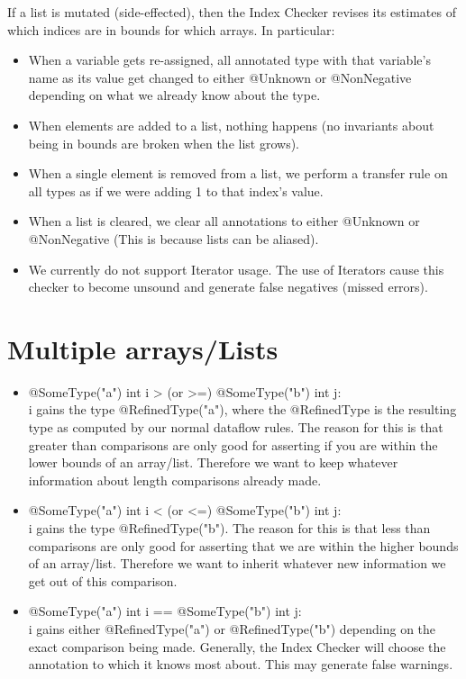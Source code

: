 If a list is mutated (side-effected), then the Index Checker revises its
estimates of which indices are in bounds for which arrays. In particular:
\begin{itemize}
\item When a variable gets re-assigned, all annotated type with that variable's name as its value
get changed to either @Unknown or @NonNegative depending on what we already know about the type.
\item When elements are added to a list, nothing happens (no invariants about being in bounds are
broken when the list grows).
\item When a single element is removed from a list, we perform a transfer rule on all types as if
we were adding 1 to that index's value.
\item When a list is cleared, we clear all annotations to either @Unknown or @NonNegative (This is
because lists can be aliased).
\item We currently do not support Iterator usage. The use of Iterators cause this checker to become
unsound and generate false negatives (missed errors).
\end{itemize}

\section{Multiple arrays/Lists\label{index-multiples}}
\begin{itemize}
\item @SomeType("a") int i > (or >=) @SomeType("b") int j:\\
i gains the type @RefinedType("a"), where the @RefinedType is the resulting type as computed by our
normal dataflow rules. The reason for this is that greater than comparisons are only good for
asserting if you are within the lower bounds of an array/list. Therefore we want to keep whatever
information about length comparisons already made.
\item @SomeType("a") int i < (or <=) @SomeType("b") int j:\\
i gains the type @RefinedType("b"). The
reason for this is that less than comparisons are only good for asserting that we are within the
higher bounds of an array/list. Therefore we want to inherit whatever new information we get out of
this comparison.
\item @SomeType("a") int i == @SomeType("b") int j:\\
i gains either @RefinedType("a") or @RefinedType("b") depending on the exact comparison being made.
Generally, the Index Checker will choose the annotation to which it knows most about. This may generate
false warnings.
\end{itemize}
